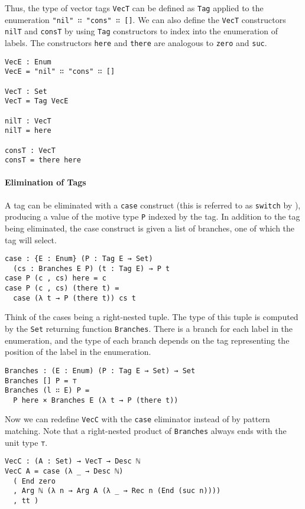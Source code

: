 \documentclass[preprint,nonatbib]{sigplanconf}
\begin{document}
Thus, the type of vector tags {\tt VecT} can be defined as
{\tt Tag} applied to the enumeration {\tt "nil" ∷ "cons" ∷ []}.
We can also define the {\tt VecT} constructors
{\tt nilT} and {\tt consT} by using
{\tt Tag} constructors to index into the enumeration of labels. The
constructors {\tt here} and {\tt there} are analogous to {\tt zero}
and {\tt suc}.

\begin{verbatim}
VecE : Enum
VecE = "nil" ∷ "cons" ∷ []

VecT : Set
VecT = Tag VecE

nilT : VecT
nilT = here

consT : VecT
consT = there here
\end{verbatim}

\paragraph{Elimination of Tags}

A tag can be eliminated with a {\tt case} construct (this is referred to
as {\tt switch} by \citet{Chapman:2010:GAL:1932681.1863547,dagand:phd}),
producing a value of the motive type {\tt P} indexed by the tag.
In addition to the tag being eliminated, the case construct is given a
list of branches, one of which the tag will select.

\begin{verbatim}
case : {E : Enum} (P : Tag E → Set)
  (cs : Branches E P) (t : Tag E) → P t
case P (c , cs) here = c
case P (c , cs) (there t) =
  case (λ t → P (there t)) cs t
\end{verbatim}

Think of the cases being a right-nested tuple. The type of this tuple
is computed by the {\tt Set} returning function {\tt Branches}.
There is a branch for each label in the enumeration, and the type of
each branch depends on the tag representing the position of the label
in the enumeration.

\begin{verbatim}
Branches : (E : Enum) (P : Tag E → Set) → Set
Branches [] P = ⊤
Branches (l ∷ E) P =
  P here × Branches E (λ t → P (there t))
\end{verbatim}

Now we can redefine {\tt VecC} with the {\tt case} eliminator instead
of by pattern matching. Note that a right-nested product of
{\tt Branches} always ends with the unit type {\tt ⊤}.

\begin{verbatim}
VecC : (A : Set) → VecT → Desc ℕ
VecC A = case (λ _ → Desc ℕ)
  ( End zero
  , Arg ℕ (λ n → Arg A (λ _ → Rec n (End (suc n))))
  , tt )
\end{verbatim}
\end{document}
